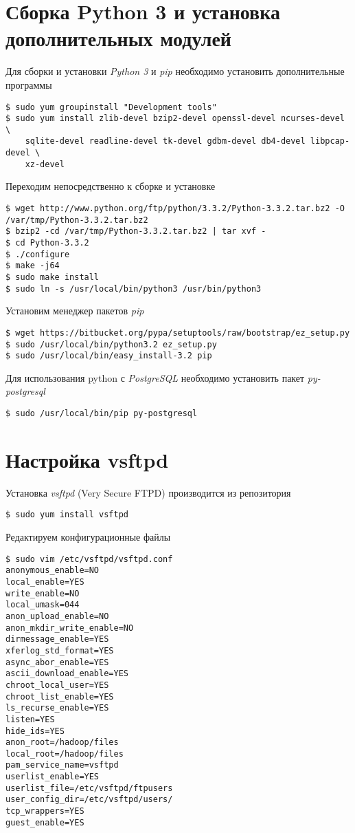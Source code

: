 \section{Сборка Python 3 и установка дополнительных модулей}
Для сборки и установки \emph{Python 3} и \emph{pip} необходимо установить дополнительные программы
\begin{lstlisting}
$ sudo yum groupinstall "Development tools"
$ sudo yum install zlib-devel bzip2-devel openssl-devel ncurses-devel \
    sqlite-devel readline-devel tk-devel gdbm-devel db4-devel libpcap-devel \
    xz-devel
\end{lstlisting}

Переходим непосредственно к сборке и установке\cite{python}
\begin{lstlisting}
$ wget http://www.python.org/ftp/python/3.3.2/Python-3.3.2.tar.bz2 -O /var/tmp/Python-3.3.2.tar.bz2
$ bzip2 -cd /var/tmp/Python-3.3.2.tar.bz2 | tar xvf -
$ cd Python-3.3.2
$ ./configure
$ make -j64
$ sudo make install
$ sudo ln -s /usr/local/bin/python3 /usr/bin/python3
\end{lstlisting}

Установим менеджер пакетов \emph{pip}\cite{pip}
\begin{lstlisting}
$ wget https://bitbucket.org/pypa/setuptools/raw/bootstrap/ez_setup.py
$ sudo /usr/local/bin/python3.2 ez_setup.py
$ sudo /usr/local/bin/easy_install-3.2 pip
\end{lstlisting}

Для использования python с \emph{PostgreSQL} необходимо установить пакет \emph{py-postgresql}
\begin{lstlisting}
$ sudo /usr/local/bin/pip py-postgresql
\end{lstlisting}

\section{Настройка vsftpd}
Установка \emph{vsftpd} (Very Secure FTPD) производится из репозитория
\begin{lstlisting}
$ sudo yum install vsftpd
\end{lstlisting}
Редактируем конфигурационные файлы 
\begin{lstlisting}
$ sudo vim /etc/vsftpd/vsftpd.conf
anonymous_enable=NO
local_enable=YES
write_enable=NO
local_umask=044
anon_upload_enable=NO
anon_mkdir_write_enable=NO
dirmessage_enable=YES
xferlog_std_format=YES
async_abor_enable=YES
ascii_download_enable=YES
chroot_local_user=YES
chroot_list_enable=YES
ls_recurse_enable=YES
listen=YES
hide_ids=YES
anon_root=/hadoop/files
local_root=/hadoop/files
pam_service_name=vsftpd
userlist_enable=YES
userlist_file=/etc/vsftpd/ftpusers
user_config_dir=/etc/vsftpd/users/
tcp_wrappers=YES
guest_enable=YES
\end{lstlisting}

